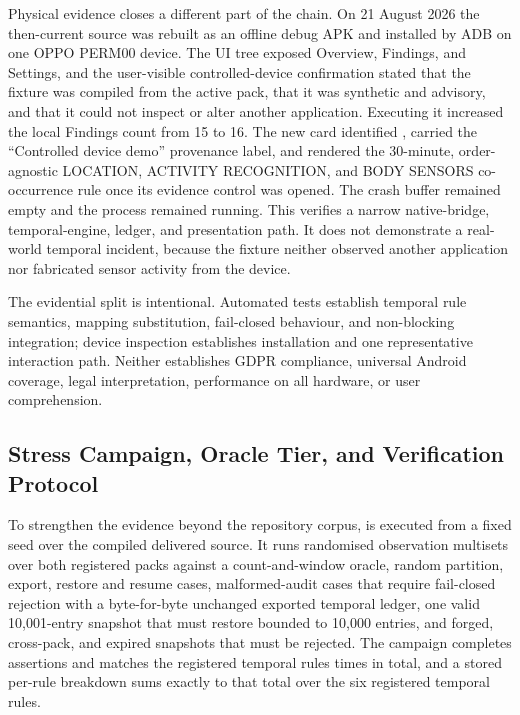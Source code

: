Physical evidence closes a different part of the chain. On 21 August 2026 the then-current source was rebuilt as an offline debug APK and installed by ADB on one OPPO PERM00 device. The UI tree exposed Overview, Findings, and Settings, and the user-visible controlled-device confirmation stated that the fixture was compiled from the active pack, that it was synthetic and advisory, and that it could not inspect or alter another application. Executing it increased the local Findings count from 15 to 16. The new card identified \texttt{}, carried the ``Controlled device demo'' provenance label, and rendered the 30-minute, order-agnostic LOCATION, ACTIVITY RECOGNITION, and BODY SENSORS co-occurrence rule once its evidence control was opened. The crash buffer remained empty and the process remained running. This verifies a narrow native-bridge, temporal-engine, ledger, and presentation path. It does not demonstrate a real-world temporal incident, because the fixture neither observed another application nor fabricated sensor activity from the device.

The evidential split is intentional. Automated tests establish temporal rule semantics, mapping substitution, fail-closed behaviour, and non-blocking integration; device inspection establishes installation and one representative interaction path. Neither establishes GDPR compliance, universal Android coverage, legal interpretation, performance on all hardware, or user comprehension.

\subsection{Stress Campaign, Oracle Tier, and Verification Protocol}

To strengthen the evidence beyond the repository corpus, \texttt{} is executed from a fixed seed over the compiled delivered source. It runs \StressCorpusN{} randomised observation multisets over both registered packs against a count-and-window oracle, \StressRestartN{} random partition, export, restore and resume cases, \StressMalformedN{} malformed-audit cases that require fail-closed rejection with a byte-for-byte unchanged exported temporal ledger, one valid 10,001-entry snapshot that must restore bounded to 10,000 entries, and forged, cross-pack, and expired snapshots that must be rejected. The campaign completes \StressAssertionsN{} assertions and matches the registered temporal rules \StressRuleMatchesN{} times in total, and a stored per-rule breakdown sums exactly to that total over the six registered temporal rules.

